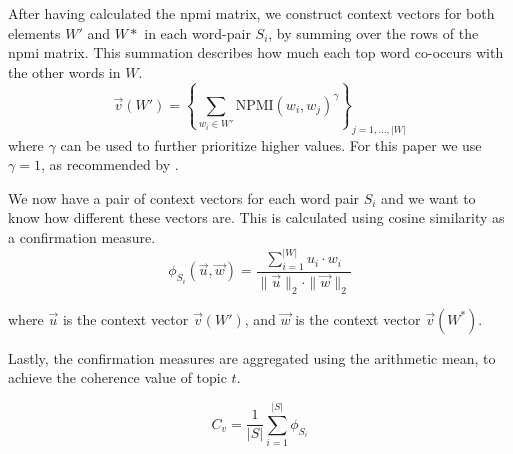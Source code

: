 After having calculated the \gls{npmi} matrix, we construct context vectors for both elements $W'$ and $W*$ in each word-pair $S_i$, by summing over the rows of the \gls{npmi} matrix.
This summation describes how much each top word co-occurs with the other words in $W$.
\begin{equation}\label{eq:coherence_1}
	\overrightarrow{v}(W') = \left\{ \sum_{w_i \in W'} \text{NPMI}(w_i, w_j)^{\gamma} \right\}_{j=1,\dots,|W|}
\end{equation}
\noindent where $\gamma$ can be used to further prioritize higher values.
For this paper we use $\gamma = 1$, as recommended by \citet{Syed2017coherence}.

We now have a pair of context vectors for each word pair $S_i$ and we want to know how different these vectors are.
This is calculated using cosine similarity as a confirmation measure.
\begin{equation}\label{eq:coherence_3}
	\phi_{S_i}(\overrightarrow{u}, \overrightarrow{w}) = \frac
	{\sum_{i = 1}^{|W|} u_i \cdot w_i}
	{\|\overrightarrow{u}\|_2 \cdot \|\overrightarrow{w}\|_2}
\end{equation}

\noindent where $\overrightarrow{u}$ is the context vector $\overrightarrow{v}(W')$, and $\overrightarrow{w}$ is the context vector $\overrightarrow{v}(W^*)$.

Lastly, the confirmation measures are aggregated using the arithmetic mean, to achieve the coherence value of topic $t$.

\begin{equation}\label{eq:coherence_4}
	C_v = \frac{1}{|S|}\sum_{i=1}^{|S|}\phi_{S_i}
\end{equation}
